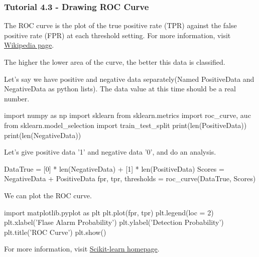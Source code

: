 \subsubsection{Tutorial 4.3 - Drawing ROC Curve}

The ROC curve is the plot of the true positive rate (TPR) against the false positive rate (FPR) at each threshold setting. For more information, visit \href{https://en.wikipedia.org/wiki/Receiver_operating_characteristic}{Wikipedia page}.

The higher the lower area of the curve, the better this data is classified.

Let's say we have positive and negative data separately(Named PositiveData and NegativeData as python lists). The data value at this time should be a real number.

\begin{python}[python3]
    import numpy as np
    import sklearn
    from sklearn.metrics import roc_curve, auc
    from sklearn.model_selection import train_test_split
    print(len(PositiveData))
    print(len(NegativeData))
\end{python}

Let's give positive data '1' and negative data '0', and do an analysis.

\begin{python}[python3]
    DataTrue = [0] * len(NegativeData) + [1] * len(PositiveData)
    Scores = NegativeData + PositiveData
    fpr, tpr, thresholds = roc_curve(DataTrue, Scores)
\end{python}

We can plot the ROC curve.

\begin{python}[python3]
    import matplotlib.pyplot as plt
    plt.plot(fpr, tpr)
    plt.legend(loc = 2)
    plt.xlabel('Flase Alarm Probability')
    plt.ylabel('Detection Probability')
    plt.title('ROC Curve')
    plt.show()
\end{python}

For more information, visit \href{https://scikit-learn.org/dev/modules/generated/sklearn.metrics.roc_curve.html}{Scikit-learn homepage}.
